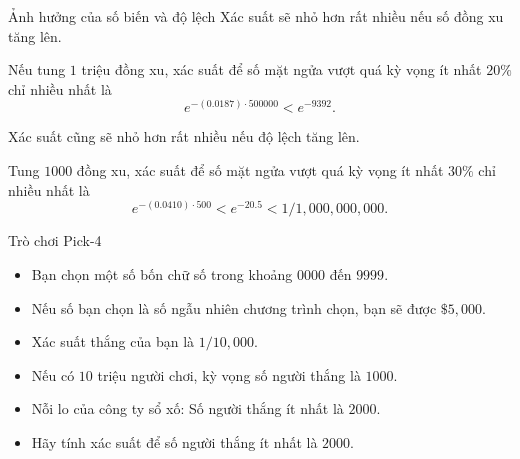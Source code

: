 \begin{frame}{Ảnh hưởng của số biến và độ lệch }
  Xác suất sẽ nhỏ hơn rất nhiều nếu số đồng xu tăng lên. 
  \begin{xmpl}
    Nếu tung $1$ triệu đồng xu, xác suất để số mặt
    ngửa vượt quá kỳ vọng ít nhất $20\%$ chỉ nhiều
    nhất là
    \[
      e^{-(0.0187)\cdot 500000} < e^{-9392}.
    \]
  \end{xmpl}\pause 

  
  Xác suất cũng sẽ nhỏ hơn rất nhiều nếu độ lệch tăng lên.
  \begin{xmpl}
    Tung $1000$ đồng xu, xác suất để số mặt ngửa vượt quá kỳ vọng ít
    nhất $30\%$ chỉ nhiều nhất là
    \[
      e^{-(0.0410)\cdot 500} < e^{-20.5}< 1/1,000,000,000.
    \]
  \end{xmpl}

\end{frame}

\begin{frame}{Trò chơi Pick-4}
  \begin{itemize}
  \item<+-> Bạn chọn một số bốn chữ số trong khoảng $0000$ đến $9999$.
  \item<+-> Nếu số bạn chọn là số ngẫu nhiên chương trình chọn, bạn sẽ được $\$5,000$.
  \item<+-> Xác suất thắng của bạn là $1/10,000$.
  \item<+-> Nếu có $10$ triệu người chơi, kỳ vọng số người thắng là $1000$. 
    
  \item<+-> Nỗi lo của công ty sổ xố: Số người thắng ít nhất là $2000$.
  \item<+-> Hãy tính xác suất để số người thắng ít nhất là $2000$.    
  \end{itemize}
\end{frame}

